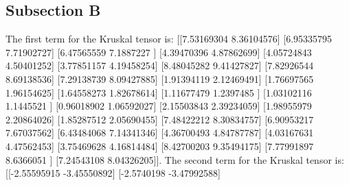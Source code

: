 \documentclass{article}%
\begin{document}
\subsection{Subsection B}%
\label{subsec:SubsectionB}%
The first term for the Kruskal tensor is: {[}{[}7.53169304 8.36104576{]}\newline%
 {[}6.95335795 7.71902727{]}\newline%
 {[}6.47565559 7.1887227 {]}\newline%
 {[}4.39470396 4.87862699{]}\newline%
 {[}4.05724843 4.50401252{]}\newline%
 {[}3.77851157 4.19458254{]}\newline%
 {[}8.48045282 9.41427827{]}\newline%
 {[}7.82926544 8.69138536{]}\newline%
 {[}7.29138739 8.09427885{]}\newline%
 {[}1.91394119 2.12469491{]}\newline%
 {[}1.76697565 1.96154625{]}\newline%
 {[}1.64558273 1.82678614{]}\newline%
 {[}1.11677479 1.2397485 {]}\newline%
 {[}1.03102116 1.1445521 {]}\newline%
 {[}0.96018902 1.06592027{]}\newline%
 {[}2.15503843 2.39234059{]}\newline%
 {[}1.98955979 2.20864026{]}\newline%
 {[}1.85287512 2.05690455{]}\newline%
 {[}7.48422212 8.30834757{]}\newline%
 {[}6.90953217 7.67037562{]}\newline%
 {[}6.43484068 7.14341346{]}\newline%
 {[}4.36700493 4.84787787{]}\newline%
 {[}4.03167631 4.47562453{]}\newline%
 {[}3.75469628 4.16814484{]}\newline%
 {[}8.42700203 9.35494175{]}\newline%
 {[}7.77991897 8.6366051 {]}\newline%
 {[}7.24543108 8.04326205{]}{]}.\newline%
\newline%
%
The second term for the Kruskal tensor is: {[}{[}{-}2.55595915 {-}3.45550892{]}\newline%
 {[}{-}2.5740198  {-}3.47992588{]}\newline%
\end{document}
